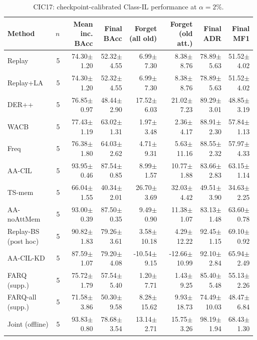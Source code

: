 \begin{table}[t]
\centering\scriptsize
\setlength{\tabcolsep}{3.3pt}
\caption{CIC17: checkpoint-calibrated Class-IL performance at $\alpha=2\%$.}\label{tab:forgetting-cic_ids_2017}
\begin{tabular}{lrrrrrrr}
\toprule
Method & $n$ & Mean inc. BAcc & Final BAcc & Forget (all old) & Forget (old att.) & Final ADR & Final MF1 \\
\midrule
Replay & 5 & 74.30$\pm$1.20 & 52.32$\pm$4.55 & 6.99$\pm$7.30 & 8.38$\pm$8.76 & 78.89$\pm$5.63 & 51.52$\pm$4.02 \\
Replay+LA & 5 & 74.30$\pm$1.20 & 52.32$\pm$4.55 & 6.99$\pm$7.30 & 8.38$\pm$8.76 & 78.89$\pm$5.63 & 51.52$\pm$4.02 \\
DER++ & 5 & 76.85$\pm$0.97 & 48.44$\pm$2.90 & 17.52$\pm$6.03 & 21.02$\pm$7.23 & 89.29$\pm$3.01 & 48.85$\pm$3.19 \\
WACB & 5 & 77.43$\pm$1.19 & 63.02$\pm$1.31 & 1.97$\pm$3.48 & 2.36$\pm$4.17 & 88.91$\pm$2.30 & 57.84$\pm$1.13 \\
Freq & 5 & 76.38$\pm$1.80 & 64.03$\pm$2.62 & 4.71$\pm$9.31 & 5.63$\pm$11.16 & 88.55$\pm$2.32 & 57.97$\pm$4.33 \\
AA-CIL & 5 & 93.95$\pm$0.46 & 87.54$\pm$0.85 & 8.99$\pm$1.57 & 10.77$\pm$1.88 & 83.66$\pm$2.83 & 63.15$\pm$1.14 \\
TS-mem & 5 & 66.04$\pm$1.55 & 40.34$\pm$2.01 & 26.70$\pm$3.69 & 32.03$\pm$4.42 & 49.51$\pm$3.90 & 34.63$\pm$2.25 \\
AA-noAttMem & 5 & 93.00$\pm$0.39 & 87.50$\pm$0.35 & 9.49$\pm$0.90 & 11.38$\pm$1.07 & 83.13$\pm$1.48 & 63.60$\pm$0.78 \\
Replay-BS (post hoc) & 5 & 90.82$\pm$1.83 & 79.26$\pm$3.61 & 3.58$\pm$10.18 & 4.29$\pm$12.22 & 92.45$\pm$1.15 & 69.10$\pm$0.92 \\
AA-CIL-KD & 5 & 87.59$\pm$1.07 & 79.20$\pm$4.08 & -10.54$\pm$9.15 & -12.66$\pm$10.99 & 92.10$\pm$2.84 & 65.94$\pm$2.49 \\
FARQ (supp.) & 5 & 75.72$\pm$1.79 & 57.54$\pm$5.40 & 1.20$\pm$7.71 & 1.43$\pm$9.25 & 85.40$\pm$5.48 & 55.13$\pm$2.26 \\
FARQ-all (supp.) & 5 & 71.58$\pm$3.86 & 50.30$\pm$9.58 & 8.28$\pm$15.62 & 9.93$\pm$18.73 & 74.49$\pm$10.03 & 48.47$\pm$6.84 \\
Joint (offline) & 5 & 93.83$\pm$0.80 & 78.68$\pm$3.54 & 13.14$\pm$2.71 & 15.75$\pm$3.26 & 98.19$\pm$1.94 & 68.43$\pm$1.30 \\
\bottomrule
\end{tabular}

\end{table}
